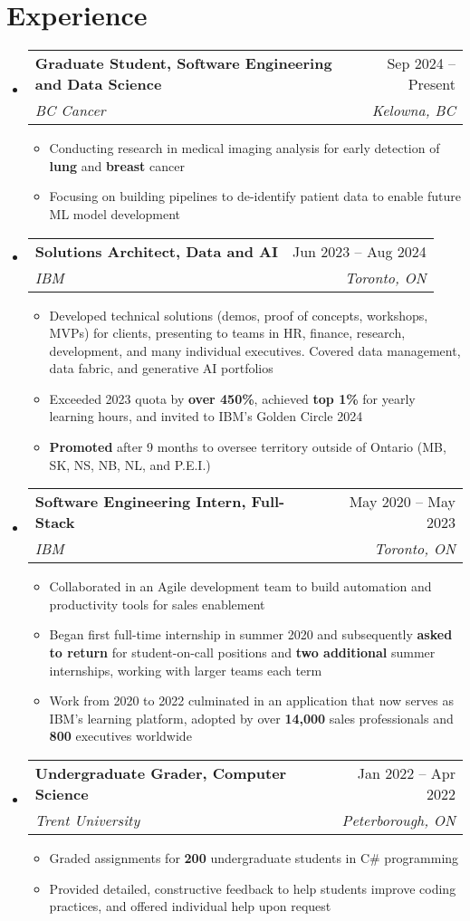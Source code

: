 \documentclass[letterpaper,11.5pt]{article}
\makeatletter
\newcommand{\resumeItem}[1]{
  \item\small{
    {#1 \vspace{-2pt}}
  }
}
\newcommand{\resumeSubheading}[4]{
  \vspace{-2pt}\item
    \begin{tabular*}{0.97\textwidth}[t]{l@{\extracolsep{\fill}}r}
      \textbf{#1} & #2 \\
      \textit{\small#3} & \textit{\small #4} \\
    \end{tabular*}\vspace{-7pt}
}
\newcommand{\resumeSubHeadingListStart}{\begin{itemize}[leftmargin=0.15in, label={}]}
\newcommand{\resumeSubHeadingListEnd}{\end{itemize}}
\newcommand{\resumeItemListStart}{\begin{itemize}}
\newcommand{\resumeItemListEnd}{\end{itemize}\vspace{-5pt}}
\makeatother
\begin{document}
\section{Experience}
  \resumeSubHeadingListStart
    \resumeSubheading
      {Graduate Student, Software Engineering and Data Science}{Sep 2024 -- Present}
      {BC Cancer}{Kelowna, BC}
      \resumeItemListStart
        \resumeItem{Conducting research in medical imaging analysis for early detection of \textbf{lung} and \textbf{breast} cancer}
        \resumeItem{Focusing on building pipelines to de-identify patient data to enable future ML model development}
      \resumeItemListEnd
    \resumeSubheading
      {Solutions Architect, Data and AI}{Jun 2023 -- Aug 2024}
      {IBM}{Toronto, ON}
      \resumeItemListStart
        \resumeItem{Developed technical solutions (demos, proof of concepts, workshops, MVPs) for clients, presenting to teams in HR, finance, research, development, and many individual executives. Covered data management, data fabric, and generative AI portfolios}
        \resumeItem{Exceeded 2023 quota by \textbf{over 450\%}, achieved \textbf{top 1\%} for yearly learning hours, and invited to IBM's Golden Circle 2024}
        \resumeItem{\textbf{Promoted} after 9 months to oversee territory outside of Ontario (MB, SK, NS, NB, NL, and P.E.I.)}
      \resumeItemListEnd
    \resumeSubheading
      {Software Engineering Intern, Full-Stack}{May 2020 -- May 2023}
      {IBM}{Toronto, ON}
      \resumeItemListStart
        \resumeItem{Collaborated in an Agile development team to build automation and productivity tools for sales enablement}
        \resumeItem{Began first full-time internship in summer 2020 and subsequently \textbf{asked to return} for student-on-call positions and \textbf{two additional} summer internships, working with larger teams each term}
        \resumeItem{Work from 2020 to 2022 culminated in an application that now serves as IBM's learning platform, adopted by over \textbf{14,000} sales professionals and \textbf{800} executives worldwide}
      \resumeItemListEnd
      \resumeSubheading
      {Undergraduate Grader, Computer Science}{Jan 2022 -- Apr 2022}
      {Trent University}{Peterborough, ON}
      \resumeItemListStart
        \resumeItem{Graded assignments for \textbf{200} undergraduate students in C\# programming}
        \resumeItem{Provided detailed, constructive feedback to help students improve coding practices, and offered individual help upon request}
      \resumeItemListEnd
  \resumeSubHeadingListEnd
\end{document}
